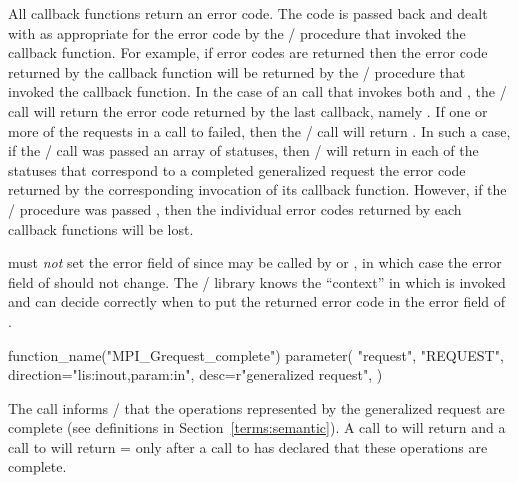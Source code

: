 All callback functions return an error code.  
The code is passed back and dealt with as appropriate for the error
code by the \MPI/ procedure that invoked the callback function.  For
example, if error codes are returned then the error code returned by
the callback function will be returned by the \MPI/ procedure that
invoked the callback function.
In the case of
an 
%
%
 call that invokes both
 and , the \MPI/ call will return
the error code returned by the last callback, namely
.  If one or more of the requests in a call to
%
%
%
%
 failed,
then the \MPI/ call will return
. 
In such a case, if the \MPI/ call was
passed an array of statuses, then \MPI/ will return in each of the
statuses that correspond to a completed generalized request the error
code returned by the corresponding invocation of its 
callback function.  However, if the \MPI/ procedure was passed
, then the individual error codes
returned by each callback functions will be lost.

\begin{users}
 must \emph{not} set the error field of
since  may be called by  or
, in which case the error field of 
should not change.  The \MPI/ library knows the ``context'' in which
 is invoked and can decide correctly when to put
the returned error code in the error field of .
\end{users}

%
\begin{mpi-binding}
    function_name("MPI_Grequest_complete")
    parameter(
        "request",
        "REQUEST",
        direction="lis:inout,param:in",
        desc=r"generalized request",
    )
\end{mpi-binding}

The call informs \MPI/ that the operations represented by the generalized request
 are 
complete (see 
definitions in Section~\ref{terms:semantic}).
A call to  will return and a call to
 will return  = 
only after a call to  has declared that
these operations are complete.

